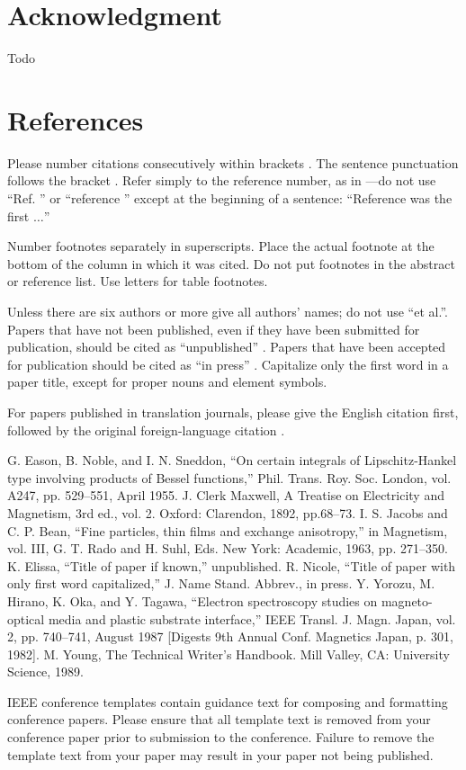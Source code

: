 \documentclass[conference]{IEEEtran}
\begin{document}
\section*{Acknowledgment}
Todo

\section*{References}

Please number citations consecutively within brackets \cite{b1}. The 
sentence punctuation follows the bracket \cite{b2}. Refer simply to the reference 
number, as in \cite{b3}---do not use ``Ref. \cite{b3}'' or ``reference \cite{b3}'' except at 
the beginning of a sentence: ``Reference \cite{b3} was the first $\ldots$''

Number footnotes separately in superscripts. Place the actual footnote at 
the bottom of the column in which it was cited. Do not put footnotes in the 
abstract or reference list. Use letters for table footnotes.

Unless there are six authors or more give all authors' names; do not use 
``et al.''. Papers that have not been published, even if they have been 
submitted for publication, should be cited as ``unpublished'' \cite{b4}. Papers 
that have been accepted for publication should be cited as ``in press'' \cite{b5}. 
Capitalize only the first word in a paper title, except for proper nouns and 
element symbols.

For papers published in translation journals, please give the English 
citation first, followed by the original foreign-language citation \cite{b6}.

\begin{thebibliography}{00}
 G. Eason, B. Noble, and I. N. Sneddon, ``On certain integrals of Lipschitz-Hankel type involving products of Bessel functions,'' Phil. Trans. Roy. Soc. London, vol. A247, pp. 529--551, April 1955.
 J. Clerk Maxwell, A Treatise on Electricity and Magnetism, 3rd ed., vol. 2. Oxford: Clarendon, 1892, pp.68--73.
 I. S. Jacobs and C. P. Bean, ``Fine particles, thin films and exchange anisotropy,'' in Magnetism, vol. III, G. T. Rado and H. Suhl, Eds. New York: Academic, 1963, pp. 271--350.
 K. Elissa, ``Title of paper if known,'' unpublished.
 R. Nicole, ``Title of paper with only first word capitalized,'' J. Name Stand. Abbrev., in press.
 Y. Yorozu, M. Hirano, K. Oka, and Y. Tagawa, ``Electron spectroscopy studies on magneto-optical media and plastic substrate interface,'' IEEE Transl. J. Magn. Japan, vol. 2, pp. 740--741, August 1987 [Digests 9th Annual Conf. Magnetics Japan, p. 301, 1982].
 M. Young, The Technical Writer's Handbook. Mill Valley, CA: University Science, 1989.
\end{thebibliography}
\vspace{12pt}
\color{red}
IEEE conference templates contain guidance text for composing and formatting conference papers. Please ensure that all template text is removed from your conference paper prior to submission to the conference. Failure to remove the template text from your paper may result in your paper not being published.
\end{document}
